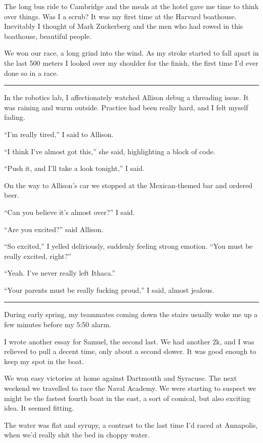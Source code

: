 The long bus ride to Cambridge and the meals at the hotel gave me time to think
over things.  Was I a scrub?  It was my first time at the Harvard boathouse.
Inevitably I thought of Mark Zuckerberg and the men who had rowed in this
boathouse, beautiful people. 

We won our race, a long grind into the wind. As my stroke started to fall apart
in the last 500 meters I looked over my shoulder for the finish, the first time
I'd ever done so in a race.

\plainfancybreak{12pt}{2}{* * *}

In the robotics lab, I affectionately watched Allison debug a threading issue.
It was raining and warm outside.  Practice had been really hard, and I felt
myself fading.

``I'm really tired,'' I said to Allison.

``I think I've almost got this,'' she said, highlighting a block of code.

``Push it, and I'll take a look tonight,'' I said.

On the way to Allison's car we stopped at the Mexican-themed bar and ordered
beer.

``Can you believe it's almost over?'' I said.

``Are you excited?'' said Allison.

``So excited,'' I yelled deliriously, suddenly feeling strong emotion.  ``You
must be really excited, right?''

``Yeah.  I've never really left Ithaca.''

``Your parents must be really fucking proud,'' I said, almost jealous.

\plainfancybreak{12pt}{2}{* * *}

During early spring, my teammates coming down the stairs usually woke me up a
few minutes before my 5:50 alarm.  

I wrote another essay for Samuel, the second last.  We had another 2k, and I was
relieved to pull a decent time, only about a second slower.  It was good enough
to keep my spot in the boat.

We won easy victories at home against Dartmouth and Syracuse.  The next weekend
we travelled to race the Naval Academy.  We were starting to suspect we might be
the fastest fourth boat in the east, a sort of comical, but also exciting idea.
It seemed fitting.  

The water was flat and syrupy, a contrast to the last time I'd raced at
Annapolis, when we'd really shit the bed in choppy water.  

